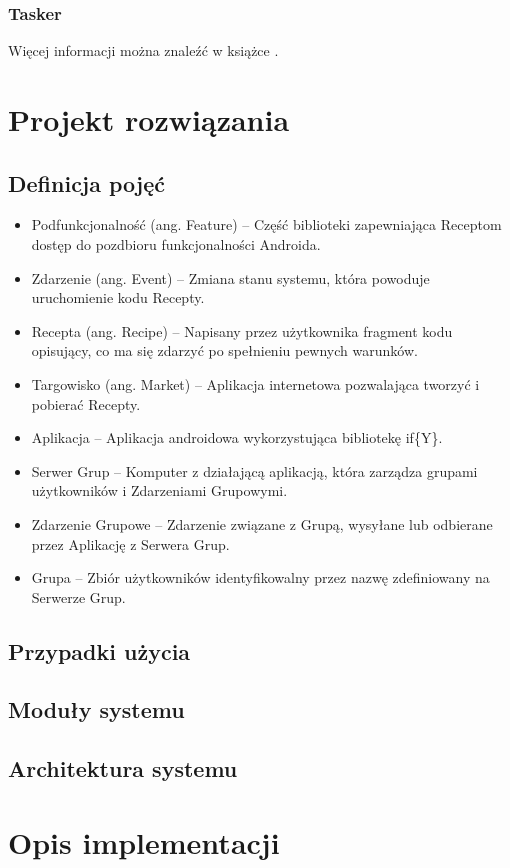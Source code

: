 \documentclass[11pt,a4paper,polish,thesis]{dcsbook}
\begin{document}
\subsection{Tasker}
Więcej informacji można znaleźć w książce \cite{sop}.
\chapter{Projekt rozwiązania}
\section{Definicja pojęć}
\begin{itemize}
\item Podfunkcjonalność (ang. Feature) -- Część biblioteki zapewniająca Receptom dostęp do pozdbioru funkcjonalności Androida.
\item Zdarzenie (ang. Event) -- Zmiana stanu systemu, która powoduje uruchomienie kodu Recepty.
\item Recepta (ang. Recipe) -- Napisany przez użytkownika fragment kodu opisujący, co ma się zdarzyć po spełnieniu pewnych warunków.
\item Targowisko (ang. Market) -- Aplikacja internetowa pozwalająca tworzyć i pobierać Recepty.
\item Aplikacja -- Aplikacja androidowa wykorzystująca bibliotekę if\{Y\}. 
\item Serwer Grup -- Komputer z działającą aplikacją, która zarządza grupami użytkowników i Zdarzeniami Grupowymi.
\item Zdarzenie Grupowe -- Zdarzenie związane z Grupą, wysyłane lub odbierane przez Aplikację z Serwera Grup.
\item Grupa -- Zbiór użytkowników identyfikowalny przez nazwę zdefiniowany na Serwerze Grup.
\end{itemize}

\section{Przypadki użycia}
\section{Moduły systemu}
\section{Architektura systemu}


\chapter{Opis implementacji}
\end{document}
